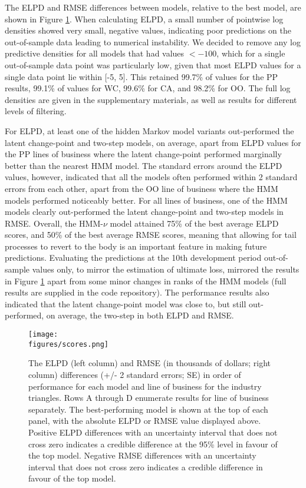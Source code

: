 The ELPD and RMSE differences between models, relative to
the best model,
are shown in Figure \ref{fig:backtest-scores}.
When calculating ELPD, a small number of pointwise log densities 
showed very small, negative values, indicating poor predictions
on the out-of-sample data leading to numerical instability. 
We decided to remove any log predictive
densities for all models that had values $< -100$, which for a single
out-of-sample data point was particularly low, given that most
ELPD values for a single data point lie within [-5, 5]. This retained 99.7\%
of values for the PP results, 99.1\% of values for WC, 99.6\%
for CA, and 98.2\% for OO. The full log densities are given in the
supplementary materials, as well as results for different levels
of filtering.

For ELPD, at least one of the
hidden Markov model variants out-performed
the latent change-point and 
two-step models, on average, 
apart from ELPD values for the PP
lines of business where the latent change-point
performed marginally better than the nearest
HMM model. The standard errors around the ELPD
values, however, indicated that all the models
often performed within 2 standard errors from each other,
apart from the OO line of business where the HMM models
performed noticeably better.
For all lines of business, one of the HMM 
models clearly out-performed the latent change-point
and two-step models in RMSE.
Overall, the HMM-$\nu$ model attained
75\% of the best average ELPD scores, and 50\%
of the best average RMSE scores, meaning that
allowing for tail processes to revert
to the body is an important feature in making
future predictions.
Evaluating the predictions at the 10th
development period
out-of-sample values only, to mirror
the estimation of ultimate loss,
mirrored the results in Figure
\ref{fig:backtest-scores} apart from some
minor changes in ranks of the HMM
models (full results are supplied
in the code repository).
The performance results also indicated
that the latent change-point model
was close to, but still out-performed,
on average, the two-step in both ELPD and RMSE.


\begin{figure}
    \centering
    \texttt{[image: \\figures/scores.png]}
    \caption{
        The ELPD (left column) and RMSE (in thousands of dollars; right column)
		differences (+/- 2 standard errors; SE) in order of performance
        for each model and line of business for the industry
        triangles. Rows A through D enumerate results
        for line of business separately.
        The best-performing model is shown at the top of each
        panel, with the absolute ELPD or RMSE value displayed above.
        Positive ELPD differences with an uncertainty interval that does not
        cross zero indicates a credible difference at the 95\% level
        in favour of the top model.
        Negative RMSE differences with an uncertainty interval
        that does not cross zero indicates a credible difference
        in favour of the top model.
    }
	\label{fig:backtest-scores}
\end{figure}

